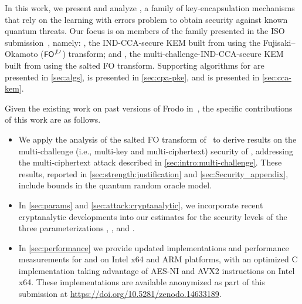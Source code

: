 In this work, we present and analyze \FrodoKEM, a family of key-encapsulation mechanisms that rely on the learning with errors problem to obtain security against known quantum threats.
Our focus is on members of the \FrodoKEM family presented in the ISO submission~\cite{ISOdraft}, namely: \eFrodoKEM, the IND-CCA-secure KEM built from \FrodoPKE using the Fujisaki--Okamoto ($\textsf{\upshape\mdseries FO}^{\not\perp\prime}$) transform; and \FrodoKEM, the multi-challenge-IND-CCA-secure KEM built from \FrodoPKE using the salted FO transform.
Supporting algorithms for \FrodoKEM are presented in \autoref{sec:algs}, \FrodoPKE is presented in \autoref{sec:cpa-pke}, and \FrodoKEM is presented in \autoref{sec:cca-kem}.

Given the existing work on past versions of Frodo in~\cite{CCS:BCDMNN16,NISTPQC-R1:FrodoKEM17,NISTPQC-R2:FrodoKEM19,NISTPQC-R3:FrodoKEM20,ISOdraft}, the specific contributions of this work are as follows.
\begin{itemize}
\item We apply the analysis of the salted FO transform  of~\cite{Multi-challenge} to derive results on the multi-challenge (i.e., multi-key and multi-ciphertext) security of \FrodoKEM, addressing the multi-ciphertext attack described in \autoref{sec:intro:multi-challenge}.
 These results, reported in \autoref{sec:strength:justification} and \autoref{sec:Security_appendix}, include bounds in the quantum random oracle model.
\item In \autoref{sec:params} and \autoref{sec:attack:cryptanalytic}, we incorporate recent cryptanalytic developments into our estimates for the security levels of the three parameterizations \FrodoLOne, \FrodoLThree, and \FrodoLFive.
\item In \autoref{sec:performance} we provide updated implementations and performance measurements for \FrodoKEM and \eFrodoKEM on Intel x64 and ARM platforms, with an optimized C implementation taking advantage of AES-NI and AVX2 instructions on Intel x64.
 These implementations are available anonymized as part of this submission at \url{https://doi.org/10.5281/zenodo.14633189}.
\end{itemize}

